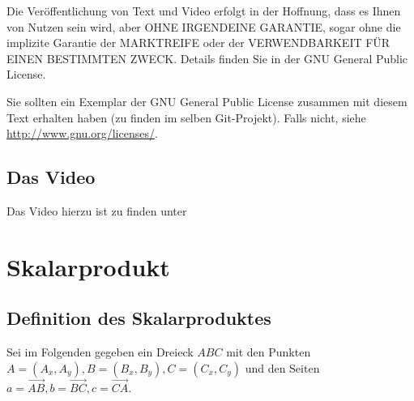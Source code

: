 \documentclass[a4paper]{amsart}
\theoremstyle{definition}
\begin{document}
Die Veröffentlichung von Text und Video erfolgt in der Hoffnung, dass es Ihnen von Nutzen sein wird, 
aber OHNE IRGENDEINE GARANTIE, sogar ohne die implizite Garantie der MARKTREIFE oder der 
VERWENDBARKEIT FÜR EINEN BESTIMMTEN ZWECK. Details finden Sie in der GNU General Public License.

Sie sollten ein Exemplar der GNU General Public License zusammen mit diesem Text erhalten haben 
(zu finden im selben Git-Projekt). 
Falls nicht, siehe \url{http://www.gnu.org/licenses/}.

\subsection*{Das Video}
Das Video hierzu ist zu finden unter 
{\tiny
   \url{}
}

\section{Skalarprodukt}

\subsection{Definition des Skalarproduktes}
Sei im Folgenden gegeben ein Dreieck $ABC$ mit den Punkten $A =(A_x,A_y), B =(B_x,B_y), C =(C_x,C_y)$ und den Seiten $a = \overrightarrow{AB}, b = \overrightarrow{BC}, c = \overrightarrow{CA}$.
\end{document}
